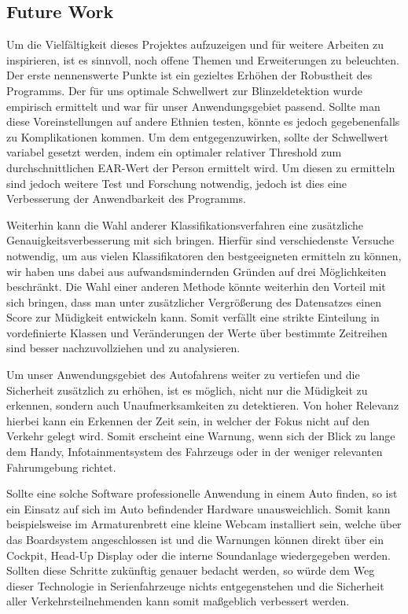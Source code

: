\subsection{Future Work}
Um die Vielfältigkeit dieses Projektes aufzuzeigen und für weitere Arbeiten zu inspirieren, ist es sinnvoll, noch offene Themen und Erweiterungen zu beleuchten. Der erste nennenswerte Punkte ist ein gezieltes Erhöhen der Robustheit des Programms. Der für uns optimale Schwellwert zur Blinzeldetektion wurde empirisch ermittelt und war für unser Anwendungsgebiet passend. Sollte man diese Voreinstellungen auf andere Ethnien testen, könnte es jedoch gegebenenfalls zu Komplikationen kommen. Um dem entgegenzuwirken, sollte der Schwellwert variabel gesetzt werden, indem ein optimaler relativer Threshold zum durchschnittlichen EAR-Wert der Person ermittelt wird. Um diesen zu ermitteln sind jedoch weitere Test und Forschung notwendig, jedoch ist dies eine Verbesserung der Anwendbarkeit des Programms.

Weiterhin kann die Wahl anderer Klassifikationsverfahren eine zusätzliche Genauigkeitsverbesserung mit sich bringen. Hierfür sind verschiedenste Versuche notwendig, um aus vielen Klassifikatoren den bestgeeigneten ermitteln zu können, wir haben uns dabei aus aufwandsmindernden Gründen auf drei Möglichkeiten beschränkt. Die Wahl einer anderen Methode könnte weiterhin den Vorteil mit sich bringen, dass man unter zusätzlicher Vergrößerung des Datensatzes einen Score zur Müdigkeit entwickeln kann. Somit verfällt eine strikte Einteilung in vordefinierte Klassen und Veränderungen der Werte über bestimmte Zeitreihen sind besser nachzuvollziehen und zu analysieren.

Um unser Anwendungsgebiet des Autofahrens weiter zu vertiefen und die Sicherheit zusätzlich zu erhöhen, ist es möglich, nicht nur die Müdigkeit zu erkennen, sondern auch Unaufmerksamkeiten zu detektieren. Von hoher Relevanz hierbei kann ein Erkennen der Zeit sein, in welcher der Fokus nicht auf den Verkehr gelegt wird. Somit erscheint eine Warnung, wenn sich der Blick zu lange dem Handy, Infotainmentsystem des Fahrzeugs oder in der weniger relevanten Fahrumgebung richtet.

Sollte eine solche Software professionelle Anwendung in einem Auto finden, so ist ein Einsatz auf sich im Auto befindender Hardware unausweichlich. Somit kann beispielsweise im Armaturenbrett eine kleine Webcam installiert sein, welche über das Boardsystem angeschlossen ist und die Warnungen können direkt über ein Cockpit, Head-Up Display oder die interne Soundanlage wiedergegeben werden. Sollten diese Schritte zukünftig genauer bedacht werden, so würde dem Weg dieser Technologie in Serienfahrzeuge nichts entgegenstehen und die Sicherheit aller Verkehrsteilnehmenden kann somit maßgeblich verbessert werden.



